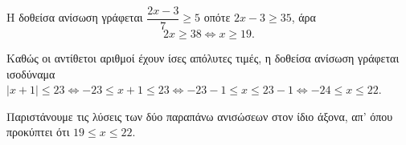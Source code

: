 
\begin{alist}
\item H δοθείσα ανίσωση γράφεται $\dfrac{2x - 3}{7} \ge 5$ οπότε $2x - 3 \ge 35$, άρα
\[2x \ge 38 \Leftrightarrow x \ge 19.\]

\item Καθώς οι αντίθετοι αριθμοί έχουν ίσες απόλυτες τιμές, η δοθείσα ανίσωση γράφεται
ισοδύναμα $|x + 1| \le 23 \Leftrightarrow -23 \le x + 1 \le 23 \Leftrightarrow -23 - 1 \le x \le 23 - 1 \Leftrightarrow -24 \le x \le 22$.

\item Παριστάνουμε τις λύσεις των δύο παραπάνω ανισώσεων στον ίδιο άξονα, απ’ όπου
προκύπτει ότι $19 \le x \le 22$.
\end{alist}

